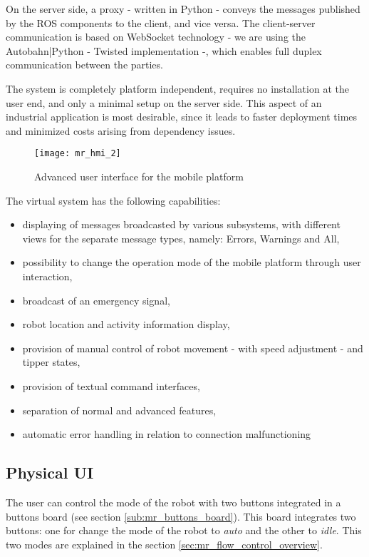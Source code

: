 	On the server side, a proxy - written in Python\cite{python} - conveys the messages published by the ROS\cite{ros} components to the client, and vice versa. The client-server communication is based on WebSocket\cite{ws} technology - we are using the Autobahn|Python\cite{autobahn} - Twisted\cite{twisted} implementation -, which enables full duplex communication between the parties.
	
	The system is completely platform independent, requires no installation at the user end, and only a minimal setup on the server side. This aspect of an industrial application is most desirable, since it leads to faster deployment times and minimized costs arising from dependency issues.
	
	\begin{figure}[H]
		\centering
		\texttt{[image: mr\_hmi\_2]}
		\caption{Advanced user interface for the mobile platform}
		\label{fig:mr_hmi_2}
	\end{figure}
	
	The virtual system has the following capabilities:
	
	\begin{itemize}
		\item displaying of messages broadcasted by various  subsystems, with different views for the separate message types, namely: Errors, Warnings and All,
		\item possibility to change the operation mode of the mobile platform through user interaction,
		\item broadcast of an emergency signal,
		\item robot location and activity information display,
		\item provision of manual control of robot movement - with speed adjustment - and tipper states,
		\item provision of textual command interfaces,
		\item separation of normal and advanced features,
		\item automatic error handling in relation to connection malfunctioning 
	\end{itemize}


	\subsection{Physical UI} %
	\label{sub:mr_physical_devices}
	The user can control the mode of the robot with two buttons integrated in a buttons board (see section \ref{sub:mr_buttons_board}).
	This board integrates two buttons: one for change the mode of the robot to \emph{auto} and the other to \emph{idle}. This two modes are explained in the section \ref{sec:mr_flow_control_overview}.


